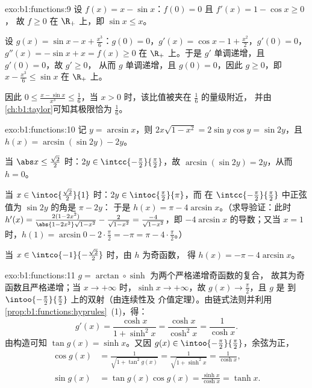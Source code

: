 \begin{solution}{exo:b1:functions:9}
设 $f(x) = x - \sin x$：$f(0) = 0$ 且 $f'(x) = 1 - \cos x \geq 0$，
故 $f \geq 0$ 在 $\R_+$ 上，即 $\sin x \leq x$。

设 $g(x) = \sin x - x + \frac{x^3}{6}$：$g(0) = 0$，$g'(x) = \cos x -
1 + \frac{x^2}{2}$，$g'(0) = 0$，$g''(x) = -\sin x + x = f(x) \geq 0$
在 $\R_+$ 上。于是 $g'$ 单调递增，且 $g'(0) = 0$，故 $g' \geq 0$，
从而 $g$ 单调递增，且 $g(0) = 0$，因此 $g \geq 0$，即 $x -
\frac{x^3}{6} \leq \sin x$ 在 $\R_+$ 上。

因此 $0 \leq \frac{x - \sin x}{x^3} \leq \frac 16$，当 $x >
0$ 时，该比值被夹在 $\frac16$ 的量级附近，
并由\cref{ch:b1:taylor}可知其极限恰为 $\frac 16$。
\end{solution}

\begin{solution}{exo:b1:functions:10}
记 $y = \arcsin x$，则 $2x\sqrt{1 - x^2} = 2\sin y\cos y = \sin
2y$，且 $h(x) = \arcsin(\sin 2y) - 2y$。

当 $\abs x \leq \frac{\sqrt 2}{2}$ 时：$2y \in
\intcc{-\frac\pi2}{\frac\pi2}$，故 $\arcsin(\sin 2y) = 2y$，从而 $h =
0$。

当 $x \in \intoc{\frac{\sqrt 2}{2}}{1}$ 时：$2y \in
\intoc{\frac\pi2}{\pi}$，而
在 $\intcc{-\frac\pi2}{\frac\pi2}$ 中正弦值为 $\sin 2y$ 的角是 $\pi - 2y$：
于是 $h(x) = \pi - 4\arcsin x$。（求导验证：此时
$h'(x) = \frac{2(1 - 2x^2)}{\abs{1 - 2x^2}\sqrt{1 - x^2}} -
\frac{2}{\sqrt{1-x^2}} = \frac{-4}{\sqrt{1 - x^2}}$，即
$-4\arcsin x$ 的导数；又当 $x = 1$ 时，$h(1) = \arcsin 0 - 2\cdot\frac\pi2
= -\pi = \pi - 4\cdot\frac\pi2$。）

当 $x \in \intco{-1}{-\frac{\sqrt 2}{2}}$ 时，由 $h$ 为奇函数，
得 $h(x) = -\pi - 4\arcsin x$。
\end{solution}

\begin{solution}{exo:b1:functions:11}
$g = \arctan \circ \sinh$ 为两个严格递增奇函数的复合，
故其为奇函数且严格递增；当 $x \to
+\infty$ 时，$\sinh x \to +\infty$，故 $g(x) \to \frac\pi2$，且 $g$ 是
到 $\intoo{-\frac\pi2}{\frac\pi2}$ 上的双射（由连续性及
介值定理）。由链式法则并利用
\cref{prop:b1:functions:hyprules}~(1)，得：
\[
g'(x) = \frac{\cosh x}{1 + \sinh^2 x} = \frac{\cosh x}{\cosh^2 x}
= \frac{1}{\cosh x} .
\]
由构造可知 $\tan g(x) = \sinh x$。又因 $g(x) \in
\intoo{-\frac\pi2}{\frac\pi2}$，余弦为正，
\begin{align*}
\cos g(x) &= \frac{1}{\sqrt{1 + \tan^2 g(x)}}
= \frac{1}{\sqrt{1 + \sinh^2 x}} = \frac{1}{\cosh x},\\
\sin g(x) &= \tan g(x) \cos g(x) = \frac{\sinh x}{\cosh x} = \tanh x .
\end{align*}
\end{solution}

